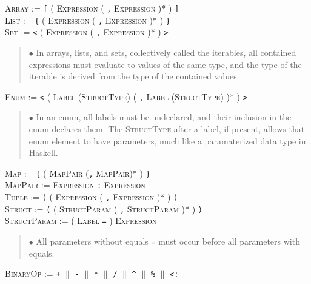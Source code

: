 \documentclass{article}
\newcommand{\code}[1]{\colorbox{light-gray}{\texttt{#1}}}
\begin{document}
\textsc{Array} := \code{[} ( \textsc{Expression} ( \code{,} \textsc{Expression} )* ) \code{]} \\

\textsc{List} := \code{\{} ( \textsc{Expression} ( \code{,} \textsc{Expression} )* ) \code{\}} \\

\textsc{Set} := \code{<} ( \textsc{Expression} ( \code{,} \textsc{Expression} )* ) \code{>}

\begin{quote} $\bullet$ In arrays, lists, and sets, collectively called the iterables, all contained expressions must evaluate to values of the same type, and the type of the iterable is derived from the type of the contained values. \end{quote}

\textsc{Enum} := \code{<} ( \textsc{Label} (\textsc{StructType}) ( \code{,} \textsc{Label} (\textsc{StructType}) )* ) \code{>}

\begin{quote} $\bullet$ In an enum, all labels must be undeclared, and their inclusion in the enum declares them. The \textsc{StructType} after a label, if present, allows that enum element to have parameters, much like a paramaterized data type in Haskell. \end{quote}

\textsc{Map} := \code{\{} ( \textsc{MapPair} (\code{,} \textsc{MapPair})* ) \code{\}} \\

\textsc{MapPair} := \textsc{Expression} \code{:} \textsc{Expression} \\

\textsc{Tuple} := \code{(} ( \textsc{Expression} ( \code{,} \textsc{Expression} )* ) \code{)} \\

\textsc{Struct} := \code{(} ( \textsc{StructParam} ( \code{,} \textsc{StructParam} )* ) \code{)} \\

\textsc{StructParam} := ( \textsc{Label} \code{=} ) \textsc{Expression}

\begin{quote} $\bullet$ All parameters without equals \code{=} must occur before all parameters with equals. \end{quote}

\textsc{BinaryOp} := \code{+} $\|$ \code{-} $\|$ \code{*} $\|$ \code{/} $\|$ \code{\^} $\|$ \code{\%} $\|$ \code{<:} \\
\end{document}
